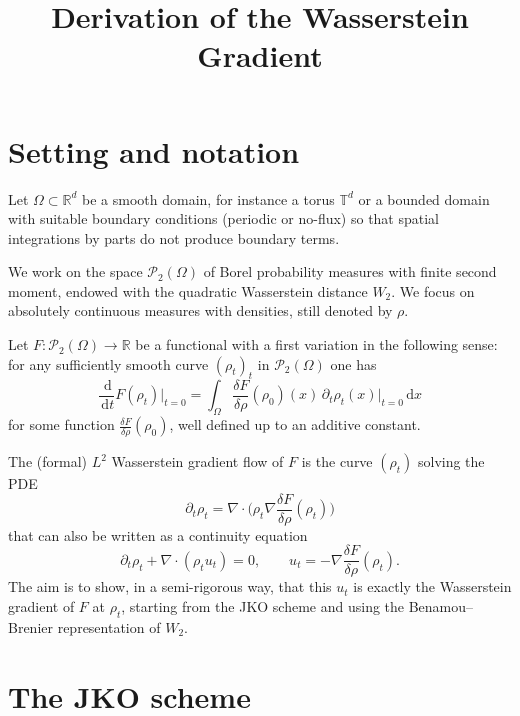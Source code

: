 \documentclass[11pt]{article}
\numberwithin{equation}{section}
\theoremstyle{definition}
\newcommand{\R}{\mathbb{R}}
\newcommand{\Ptwo}{\mathcal{P}_2}
\newcommand{\dd}{\,\mathrm{d}}
\begin{document}
\title{Derivation of the Wasserstein Gradient}
\author{}
\date{}
\maketitle

\section{Setting and notation}

Let $\Omega \subset \R^d$ be a smooth domain, for instance a torus $\mathbb{T}^d$ or a bounded domain with suitable boundary conditions (periodic or no-flux) so that spatial integrations by parts do not produce boundary terms.

We work on the space $\Ptwo(\Omega)$ of Borel probability measures with finite second moment, endowed with the quadratic Wasserstein distance $W_2$. We focus on absolutely continuous measures with densities, still denoted by $\rho$.

Let $F : \Ptwo(\Omega) \to \R$ be a functional with a first variation in the following sense: for any sufficiently smooth curve $(\rho_t)_{t}$ in $\Ptwo(\Omega)$ one has
\[
\frac{\dd}{\dd t} F(\rho_t)\bigg|_{t=0}
= \int_{\Omega} \frac{\delta F}{\delta \rho}(\rho_0)(x) \, \partial_t \rho_t(x)\bigg|_{t=0}\dd x
\]
for some function $\frac{\delta F}{\delta \rho}(\rho_0)$, well defined up to an additive constant.

The (formal) $L^2$ Wasserstein gradient flow of $F$ is the curve $(\rho_t)$ solving the PDE
\begin{equation}
\label{eq:WGF-PDE}
\partial_t \rho_t = \nabla\cdot\Big(\rho_t \nabla \frac{\delta F}{\delta \rho}(\rho_t)\Big)
\end{equation}
that can also be written as a continuity equation
\begin{equation}
\label{eq:continuity-u}
\partial_t \rho_t + \nabla\cdot(\rho_t u_t) = 0,
\qquad
u_t = -\nabla\frac{\delta F}{\delta \rho}(\rho_t).
\end{equation}
The aim is to show, in a semi-rigorous way, that this $u_t$ is exactly the Wasserstein gradient of $F$ at $\rho_t$, starting from the JKO scheme and using the Benamou--Brenier representation of $W_2$.

\section{The JKO scheme}
\end{document}
